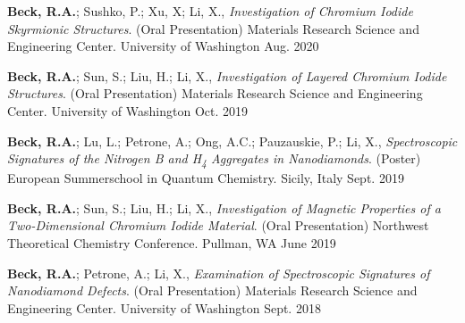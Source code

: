 

\begin{cvpresentations}

\cvpresentation %
{\textbf{Beck, R.A.}; Sushko, P.; Xu, X; Li, X., \textit{Investigation of Chromium Iodide Skyrmionic Structures}. (Oral Presentation) Materials Research Science and Engineering Center.}
{University of Washington} %
{Aug. 2020} %


\cvpresentation %
{\textbf{Beck, R.A.}; Sun, S.; Liu, H.; Li, X., \textit{Investigation of Layered Chromium Iodide Structures}. (Oral Presentation) Materials Research Science and Engineering Center.}
{University of Washington} %
{Oct. 2019} %


\cvpresentation %
{\textbf{Beck, R.A.}; Lu, L.; Petrone, A.; Ong, A.C.; Pauzauskie, P.; Li, X., \textit{Spectroscopic Signatures of the Nitrogen B and H\textsubscript{4} Aggregates in Nanodiamonds}. (Poster) European Summerschool in Quantum Chemistry.}
{Sicily, Italy} %
{Sept. 2019} %


\cvpresentation %
{\textbf{Beck, R.A.}; Sun, S.; Liu, H.; Li, X., \textit{Investigation of Magnetic Properties of a Two-Dimensional Chromium Iodide Material}. (Oral Presentation) Northwest Theoretical Chemistry Conference.}
{Pullman, WA} %
{June 2019} %


\cvpresentation %
{\textbf{Beck, R.A.}; Petrone, A.; Li, X., \textit{Examination of Spectroscopic Signatures of Nanodiamond Defects}. (Oral Presentation) Materials Research Science and Engineering Center.}
{University of Washington} %
{Sept. 2018} %



\end{cvpresentations}

